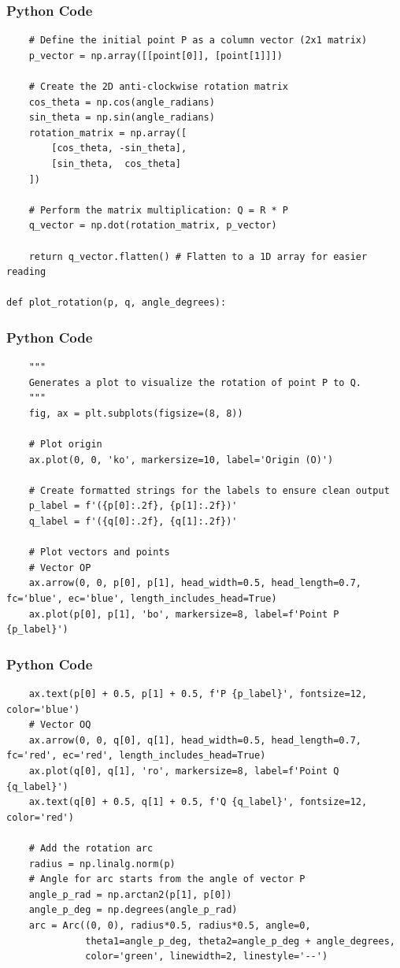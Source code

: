 \documentclass{beamer}
\begin{document}
\begin{frame}[fragile]
\frametitle{Python Code}
\begin{lstlisting}
    # Define the initial point P as a column vector (2x1 matrix)
    p_vector = np.array([[point[0]], [point[1]]])

    # Create the 2D anti-clockwise rotation matrix
    cos_theta = np.cos(angle_radians)
    sin_theta = np.sin(angle_radians)
    rotation_matrix = np.array([
        [cos_theta, -sin_theta],
        [sin_theta,  cos_theta]
    ])

    # Perform the matrix multiplication: Q = R * P
    q_vector = np.dot(rotation_matrix, p_vector)

    return q_vector.flatten() # Flatten to a 1D array for easier reading

def plot_rotation(p, q, angle_degrees):
\end{lstlisting}
\end{frame}
\begin{frame}[fragile]
\frametitle{Python Code}
\begin{lstlisting}
    """
    Generates a plot to visualize the rotation of point P to Q.
    """
    fig, ax = plt.subplots(figsize=(8, 8))

    # Plot origin
    ax.plot(0, 0, 'ko', markersize=10, label='Origin (O)')

    # Create formatted strings for the labels to ensure clean output
    p_label = f'({p[0]:.2f}, {p[1]:.2f})'
    q_label = f'({q[0]:.2f}, {q[1]:.2f})'

    # Plot vectors and points
    # Vector OP
    ax.arrow(0, 0, p[0], p[1], head_width=0.5, head_length=0.7, fc='blue', ec='blue', length_includes_head=True)
    ax.plot(p[0], p[1], 'bo', markersize=8, label=f'Point P {p_label}')
    \end{lstlisting}
\end{frame}
\begin{frame}[fragile]
\frametitle{Python Code}
\begin{lstlisting}
    ax.text(p[0] + 0.5, p[1] + 0.5, f'P {p_label}', fontsize=12, color='blue')
    # Vector OQ
    ax.arrow(0, 0, q[0], q[1], head_width=0.5, head_length=0.7, fc='red', ec='red', length_includes_head=True)
    ax.plot(q[0], q[1], 'ro', markersize=8, label=f'Point Q {q_label}')
    ax.text(q[0] + 0.5, q[1] + 0.5, f'Q {q_label}', fontsize=12, color='red')

    # Add the rotation arc
    radius = np.linalg.norm(p)
    # Angle for arc starts from the angle of vector P
    angle_p_rad = np.arctan2(p[1], p[0])
    angle_p_deg = np.degrees(angle_p_rad)
    arc = Arc((0, 0), radius*0.5, radius*0.5, angle=0,
              theta1=angle_p_deg, theta2=angle_p_deg + angle_degrees,
              color='green', linewidth=2, linestyle='--')
              \end{lstlisting}
\end{frame}
\end{document}
